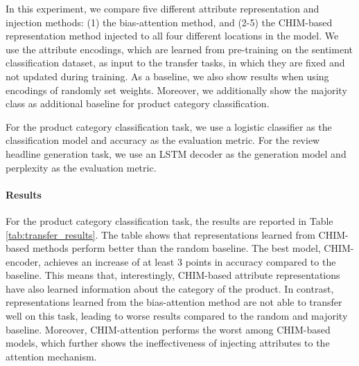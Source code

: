 \documentclass[11pt,a4paper]{article}
\begin{document}
In this experiment, we compare five different attribute representation and injection methods: (1) the bias-attention method, and (2-5) the CHIM-based representation method injected to all four different locations in the model. We use the attribute encodings, which are learned from pre-training on the sentiment classification dataset, as input to the transfer tasks, in which they are fixed and not updated during training. As a baseline, we also show results when using encodings of randomly set weights. Moreover, we additionally show the majority class as additional baseline for product category classification.

For the product category classification task, we use a logistic classifier as the classification model and accuracy as the evaluation metric. For the review headline generation task, we use an LSTM decoder as the generation model and perplexity as the evaluation metric.

\paragraph{Results}

For the product category classification task, the results are reported in Table \ref{tab:transfer_results}. The table shows that representations learned from CHIM-based methods perform better than the random baseline. The best model, CHIM-encoder, achieves an increase of at least 3 points in accuracy compared to the baseline. This means that, interestingly, CHIM-based attribute representations have also learned information about the category of the product. In contrast, representations learned from the bias-attention method are not able to transfer well on this task, leading to worse results compared to the random and majority baseline. Moreover, CHIM-attention performs the worst among CHIM-based models, which further shows the ineffectiveness of injecting attributes to the attention mechanism.
\end{document}

